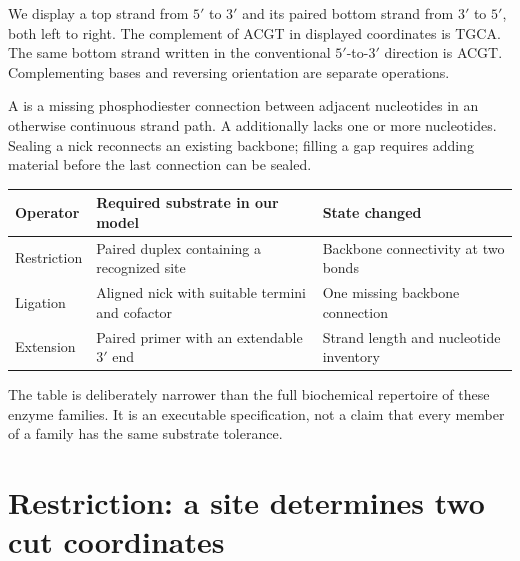 We display a top strand from $5'$ to $3'$ and its paired bottom strand from $3'$ to $5'$, both left to right. The complement of ACGT in displayed coordinates is TGCA. The same bottom strand written in the conventional $5'$-to-$3'$ direction is ACGT. Complementing bases and reversing orientation are separate operations.

A  is a missing phosphodiester connection between adjacent nucleotides in an otherwise continuous strand path. A  additionally lacks one or more nucleotides. Sealing a nick reconnects an existing backbone; filling a gap requires adding material before the last connection can be sealed.

\begin{center}
\begin{tabular}{p{.18\linewidth}p{.35\linewidth}p{.35\linewidth}}
\toprule
Operator & Required substrate in our model & State changed\\
\midrule
Restriction & Paired duplex containing a recognized site & Backbone connectivity at two bonds\\
Ligation & Aligned nick with suitable termini and cofactor & One missing backbone connection\\
Extension & Paired primer with an extendable $3'$ end & Strand length and nucleotide inventory\\
\bottomrule
\end{tabular}
\end{center}


The table is deliberately narrower than the full biochemical repertoire of these enzyme families. It is an executable specification, not a claim that every member of a family has the same substrate tolerance.

\section{Restriction: a site determines two cut coordinates}


